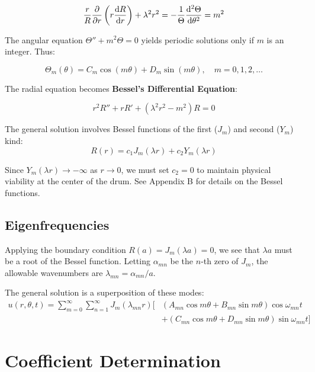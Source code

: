 \documentclass[11pt, letterpaper]{article}
\begin{document}
\begin{equation}
    \frac{r}{R} \pdv{r} \left(r \dv{R}{r} \right) + \lambda^{2} r^{2} = - \frac{1}{\Theta} \dv[2]{\Theta}{\theta} = m^2
\end{equation}

The angular equation $\Theta'' + m^2\Theta = 0$ yields periodic solutions only if $m$ is an integer. Thus:

\begin{equation}
    \Theta_m(\theta) = C_m \cos(m\theta) + D_m \sin(m\theta), \quad m = 0, 1, 2, \dots
\end{equation}

The radial equation becomes \textbf{Bessel's Differential Equation}:

\begin{equation}
    r^2 R'' + r R' + (\lambda^2 r^2 - m^2)R = 0
\end{equation}

The general solution involves Bessel functions of the first ($J_m$) and second ($Y_m$) kind:
\begin{equation}
    R(r) = c_1 J_m(\lambda r) + c_2 Y_m(\lambda r)
\end{equation}

Since $Y_m(\lambda r) \to -\infty$ as $r \to 0$, we must set $c_2 = 0$ to maintain physical viability at the center of the drum. See Appendix B for details on the Bessel functions.

\subsection{Eigenfrequencies}
Applying the boundary condition $R(a) = J_m(\lambda a) = 0$, we see that $\lambda a$ must be a root of the Bessel function. Letting $\alpha_{mn}$ be the $n$-th zero of $J_m$, the allowable wavenumbers are $\lambda_{mn} = \alpha_{mn}/a$.

The general solution is a superposition of these modes:
\begin{equation}
	\boxed{\begin{aligned}
u(r, \theta, t) = \sum_{m=0}^{\infty} \sum_{n=1}^{\infty} J_{m}(\lambda_{mn} r) \Big[ &(A_{mn} \cos m \theta + B_{mn} \sin m \theta )\cos \omega_{mn} t \\
&+ (C_{mn} \cos m \theta + D_{mn} \sin m \theta) \sin \omega_{mn} t \Big]
\end{aligned}}
\end{equation}

\section{Coefficient Determination}
\end{document}
